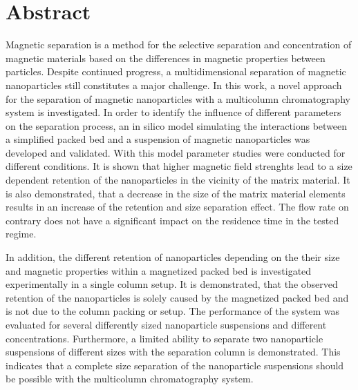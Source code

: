 \chapter{Abstract}
\label{ch:abstract_en}

Magnetic separation is a method for the selective separation and concentration of magnetic materials based on the differences in magnetic properties between particles. Despite continued progress, a multidimensional separation of magnetic nanoparticles still constitutes a major challenge. In this work, a novel approach for the separation of magnetic nanoparticles with a multicolumn chromatography system is investigated. In order to identify the influence of different parameters on the separation process, an in silico model simulating the interactions between a simplified packed bed and a suspension of magnetic nanoparticles was developed and validated. With this model parameter studies were conducted for different conditions. It is shown that higher magnetic field strenghts lead to a size dependent retention of the nanoparticles in the vicinity of the matrix material. It is also demonstrated, that a decrease in the size of the matrix material elements results in an increase of the retention and size separation effect. The flow rate on contrary does not have a significant impact on the residence time in the tested regime.  

In addition, the different retention of nanoparticles depending on the their size and magnetic properties within a magnetized packed bed is investigated experimentally in a single column setup. It is demonstrated, that the observed retention of the nanoparticles is solely caused by the magnetized packed bed and is not due to the column packing or setup. The performance of the system was evaluated for several differently sized nanoparticle suspensions and different concentrations. Furthermore, a limited ability to separate two nanoparticle suspensions of different sizes with the separation column is demonstrated. This indicates that a complete size separation of the nanoparticle suspensions should be possible with the multicolumn chromatography system. 
